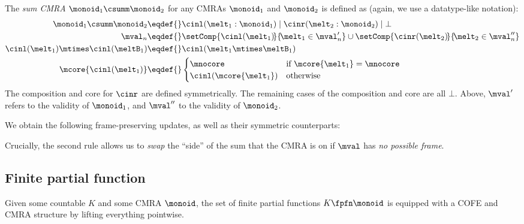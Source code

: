 The \emph{sum CMRA} $\monoid_1 \csumm \monoid_2$ for any CMRAs $\monoid_1$ and $\monoid_2$ is defined as (again, we use a datatype-like notation):
\begin{align*}
  \monoid_1 \csumm \monoid_2 \eqdef{}& \cinl(\melt_1:\monoid_1) \mid \cinr(\melt_2:\monoid_2) \mid \bot \\
  \mval_n \eqdef{}& \setComp{\cinl(\melt_1)\!}{\!\melt_1 \in \mval'_n}
    \cup \setComp{\cinr(\melt_2)\!}{\!\melt_2 \in \mval''_n}  \\
  \cinl(\melt_1) \mtimes \cinl(\meltB_1) \eqdef{}& \cinl(\melt_1 \mtimes \meltB_1)  \\
  \mcore{\cinl(\melt_1)} \eqdef{}& \begin{cases}\mnocore & \text{if $\mcore{\melt_1} = \mnocore$} \\ \cinl({\mcore{\melt_1}}) & \text{otherwise} \end{cases}
\end{align*}
The composition and core for $\cinr$ are defined symmetrically.
The remaining cases of the composition and core are all $\bot$.
Above, $\mval'$ refers to the validity of $\monoid_1$, and $\mval''$ to the validity of $\monoid_2$.

We obtain the following frame-preserving updates, as well as their symmetric counterparts:
Crucially, the second rule allows us to \emph{swap} the ``side'' of the sum that the CMRA is on if $\mval$ has \emph{no possible frame}.

\subsection{Finite partial function}
\label{sec:fpfnm}

Given some countable $K$ and some CMRA $\monoid$, the set of finite partial functions $K \fpfn \monoid$ is equipped with a COFE and CMRA structure by lifting everything pointwise.

